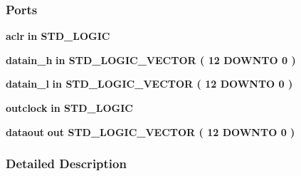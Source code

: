 \subsubsection*{Ports}
 \begin{DoxyCompactItemize}
\item 
{\bf aclr}  {\bfseries {\bfseries \textcolor{keywordflow}{in}\textcolor{vhdlchar}{ }}} {\bfseries \textcolor{comment}{S\+T\+D\+\_\+\+L\+O\+G\+IC}\textcolor{vhdlchar}{ }} 
\item 
{\bf datain\+\_\+h}  {\bfseries {\bfseries \textcolor{keywordflow}{in}\textcolor{vhdlchar}{ }}} {\bfseries \textcolor{comment}{S\+T\+D\+\_\+\+L\+O\+G\+I\+C\+\_\+\+V\+E\+C\+T\+OR}\textcolor{vhdlchar}{ }\textcolor{vhdlchar}{(}\textcolor{vhdlchar}{ }\textcolor{vhdlchar}{ } \textcolor{vhdldigit}{12} \textcolor{vhdlchar}{ }\textcolor{keywordflow}{D\+O\+W\+N\+TO}\textcolor{vhdlchar}{ }\textcolor{vhdlchar}{ } \textcolor{vhdldigit}{0} \textcolor{vhdlchar}{ }\textcolor{vhdlchar}{)}\textcolor{vhdlchar}{ }} 
\item 
{\bf datain\+\_\+l}  {\bfseries {\bfseries \textcolor{keywordflow}{in}\textcolor{vhdlchar}{ }}} {\bfseries \textcolor{comment}{S\+T\+D\+\_\+\+L\+O\+G\+I\+C\+\_\+\+V\+E\+C\+T\+OR}\textcolor{vhdlchar}{ }\textcolor{vhdlchar}{(}\textcolor{vhdlchar}{ }\textcolor{vhdlchar}{ } \textcolor{vhdldigit}{12} \textcolor{vhdlchar}{ }\textcolor{keywordflow}{D\+O\+W\+N\+TO}\textcolor{vhdlchar}{ }\textcolor{vhdlchar}{ } \textcolor{vhdldigit}{0} \textcolor{vhdlchar}{ }\textcolor{vhdlchar}{)}\textcolor{vhdlchar}{ }} 
\item 
{\bf outclock}  {\bfseries {\bfseries \textcolor{keywordflow}{in}\textcolor{vhdlchar}{ }}} {\bfseries \textcolor{comment}{S\+T\+D\+\_\+\+L\+O\+G\+IC}\textcolor{vhdlchar}{ }} 
\item 
{\bf dataout}  {\bfseries {\bfseries \textcolor{keywordflow}{out}\textcolor{vhdlchar}{ }}} {\bfseries \textcolor{comment}{S\+T\+D\+\_\+\+L\+O\+G\+I\+C\+\_\+\+V\+E\+C\+T\+OR}\textcolor{vhdlchar}{ }\textcolor{vhdlchar}{(}\textcolor{vhdlchar}{ }\textcolor{vhdlchar}{ } \textcolor{vhdldigit}{12} \textcolor{vhdlchar}{ }\textcolor{keywordflow}{D\+O\+W\+N\+TO}\textcolor{vhdlchar}{ }\textcolor{vhdlchar}{ } \textcolor{vhdldigit}{0} \textcolor{vhdlchar}{ }\textcolor{vhdlchar}{)}\textcolor{vhdlchar}{ }} 
\end{DoxyCompactItemize}


\subsubsection{Detailed Description}


